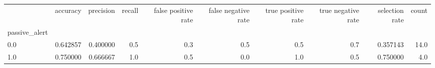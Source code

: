 \begin{tabular}{lrrrrrrrrr}
\toprule
{} &  accuracy &  precision &  recall &  false positive rate &  false negative rate &  true positive rate &  true negative rate &  selection rate &  count \\
passive\_alert &           &            &         &                      &                      &                     &                     &                 &        \\
\midrule
0.0           &  0.642857 &   0.400000 &     0.5 &                  0.3 &                  0.5 &                 0.5 &                 0.7 &        0.357143 &   14.0 \\
1.0           &  0.750000 &   0.666667 &     1.0 &                  0.5 &                  0.0 &                 1.0 &                 0.5 &        0.750000 &    4.0 \\
\bottomrule
\end{tabular}
